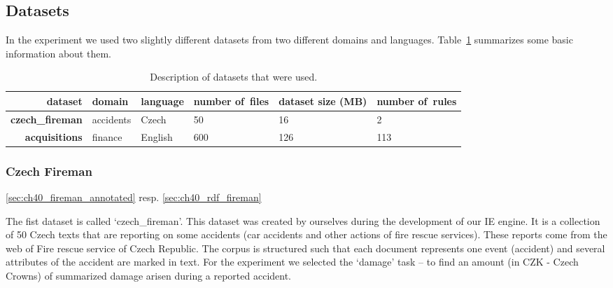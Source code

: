 \subsection{Datasets} \label{sec:ch70_datasets}

In the experiment we used two slightly different datasets from two different domains and languages.  Table~\ref{tab:datasets} summarizes some basic information about them.

\begin{table}
\begin{center}
\begin{tabular}{|r||l|l|b{20mm}|b{20mm}|b{20mm}|}
\hline
dataset & domain & language & number of~files &  dataset size (MB) &  number of~rules  \\
\hline
\hline
\textbf{czech\_fireman} & accidents & Czech &  50 &  16 &  2\\
\hline
\textbf{acquisitions} & finance & English &  600 &  126 &  113\\
\hline
\end{tabular}
\caption{Description of datasets that were used.}\centering
\end{center}
\label{tab:datasets}
\end{table}

\subsubsection{Czech Fireman}

\ref{sec:ch40_fireman_annotated} resp. \ref{sec:ch40_rdf_fireman}


The fist dataset is called `czech\_fireman'. This dataset was created by ourselves during the development of our IE  engine. It is a collection of 50 Czech texts that are reporting on some accidents (car accidents and other actions of fire rescue services). These reports come from the web of Fire rescue service of Czech Republic.
The corpus is structured such that each document represents one event (accident) and several attributes of the accident are marked in text. For the experiment we selected the `damage' task -- to find an amount (in CZK - Czech Crowns) of summarized damage arisen during a reported accident.






